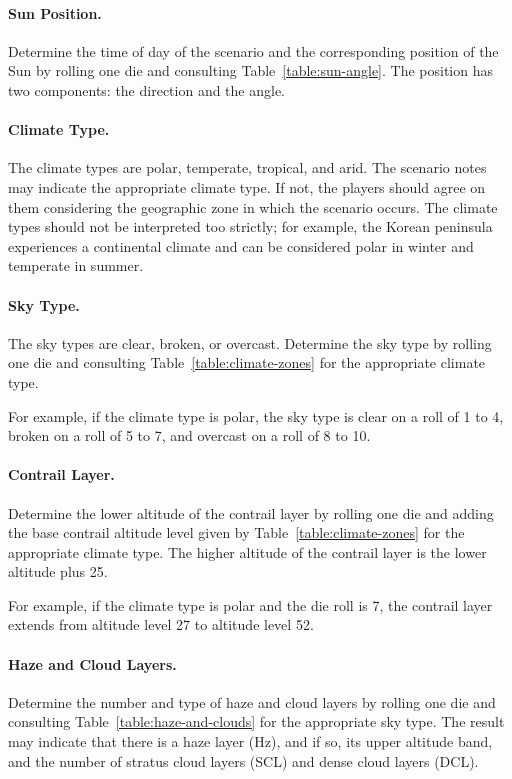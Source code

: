 \begin{advancedrules}
{\paragraph{Sun Position.}
\label{rule:sun-position}

Determine the time of day of the scenario and the corresponding position of the Sun by rolling one die and consulting Table~\ref{table:sun-angle}. The position has two components: the direction and the angle.

\paragraph{Climate Type.} The climate types are polar, temperate, tropical, and arid. The scenario notes may indicate the appropriate climate type. If not, the players should agree on them considering the geographic zone in which the scenario occurs. The climate types should not be interpreted too strictly; for example, the Korean peninsula experiences a continental climate and can be considered polar in winter and temperate in summer.

\paragraph{Sky Type.} The sky types are clear, broken, or overcast. Determine the sky type by rolling one die and consulting Table~\ref{table:climate-zones} for the appropriate climate type. 

For example, if the climate type is polar, the sky type is clear on a roll of 1 to 4, broken on a roll of 5 to 7, and overcast on a roll of 8 to 10.

\paragraph{Contrail Layer.} Determine the lower altitude of the contrail layer by rolling one die and adding the base contrail altitude level given by Table~\ref{table:climate-zones} for the appropriate climate type. The higher altitude of the contrail layer is the lower altitude plus 25.

For example, if the climate type is polar and the die roll is 7, the contrail layer extends from altitude level 27 to altitude level 52.

\paragraph{Haze and Cloud Layers.} Determine the number and type of haze and cloud layers by rolling one die and consulting Table~\ref{table:haze-and-clouds} for the appropriate sky type. The result may indicate that there is a haze layer (Hz), and if so, its upper altitude band, and the number of stratus cloud layers (SCL) and dense cloud layers (DCL). 

}
\end{advancedrules}
